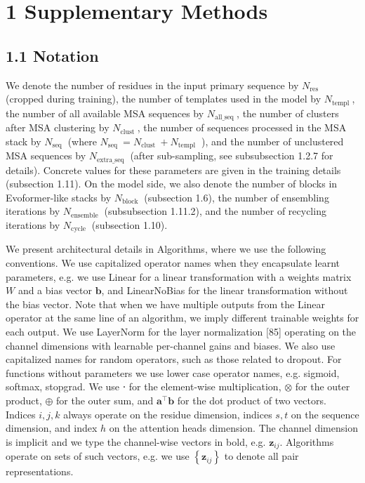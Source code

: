 \documentclass[10pt]{article}
\begin{document}
\section*{1 Supplementary Methods}
\subsection*{1.1 Notation}
We denote the number of residues in the input primary sequence by $N_{\text {res }}$ (cropped during training), the number of templates used in the model by $N_{\text {templ }}$, the number of all available MSA sequences by $N_{\text {all_seq }}$, the number of clusters after MSA clustering by $N_{\text {clust }}$, the number of sequences processed in the MSA stack by $N_{\text {seq }}$ (where $N_{\text {seq }}=N_{\text {clust }}+N_{\text {templ }}$ ), and the number of unclustered MSA sequences by $N_{\text {extra_seq }}$ (after sub-sampling, see subsubsection 1.2.7 for details). Concrete values for these parameters are given in the training details (subsection 1.11). On the model side, we also denote the number of blocks in Evoformer-like stacks by $N_{\text {block }}$ (subsection 1.6), the number of ensembling iterations by $N_{\text {ensemble }}$ (subsubsection 1.11.2), and the number of recycling iterations by $N_{\text {cycle }}$ (subsection 1.10).

We present architectural details in Algorithms, where we use the following conventions. We use capitalized operator names when they encapsulate learnt parameters, e.g. we use Linear for a linear transformation with a weights matrix $W$ and a bias vector $\mathbf{b}$, and LinearNoBias for the linear transformation without the bias vector. Note that when we have multiple outputs from the Linear operator at the same line of an algorithm, we imply different trainable weights for each output. We use LayerNorm for the layer normalization [85] operating on the channel dimensions with learnable per-channel gains and biases. We also use capitalized names for random operators, such as those related to dropout. For functions without parameters we use lower case operator names, e.g. sigmoid, softmax, stopgrad. We use ⋅ for the element-wise multiplication, $\otimes$ for the outer product, $\oplus$ for the outer sum, and $\mathbf{a}^{\top} \mathbf{b}$ for the dot product of two vectors. Indices $i, j, k$ always operate on the residue dimension, indices $s, t$ on the sequence dimension, and index $h$ on the attention heads dimension. The channel dimension is implicit and we type the channel-wise vectors in bold, e.g. $\mathbf{z}_{i j}$. Algorithms operate on sets of such vectors, e.g. we use $\left\{\mathbf{z}_{i j}\right\}$ to denote all pair representations.
\end{document}
